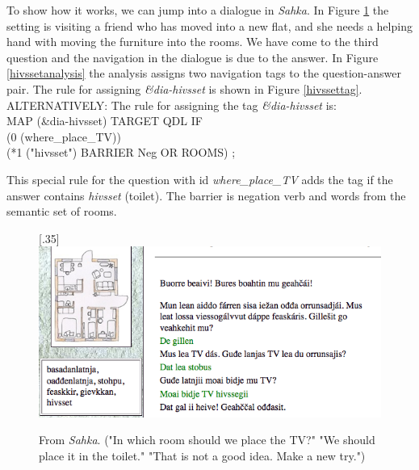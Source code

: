 \documentclass[11pt]{article}
\begin{document}
To show how it works, we can jump into a dialogue in \textit{Sahka}. In Figure \ref{sahka} the setting is visiting a friend who has moved into a new flat, and she needs a helping hand with moving the furniture into the rooms. We have come to the third question and the navigation in the dialogue is due to the answer. In Figure \ref{hivssetanalysis} the analysis assigns two navigation tags to the question-answer pair. The rule for assigning \textit{\&dia-hivsset} is shown in Figure \ref{hivssettag}. ALTERNATIVELY: The rule for assigning the tag \textit{\&dia-hivsset} is: \\
MAP (\&dia-hivsset) TARGET QDL IF \\(0 (where\_place\_TV))\\(*1 ("hivsset") BARRIER Neg OR ROOMS) ; 

This special rule for the question with id \textit{where\_place\_TV} adds the tag if the answer contains \textit{hivsset} (toilet). The barrier is negation verb and words from the semantic set of rooms. \\
 

\begin{figure}[htbp]
\begin{center}
\scalebox{.35}[.35]{\includegraphics{presentation/img/TVhivssegii.png}}\\
\caption{From \textit{Sahka}. ("In which room should we place the TV?" "We should place it in the toilet." "That is not a good idea. Make a new try.")
}
\label{sahka}
\end{center}
\end{figure}
\end{document}
